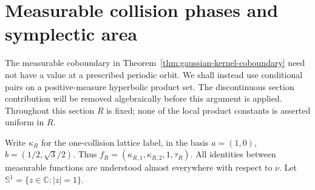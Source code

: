 \section{Measurable collision phases and symplectic area}
\label{sec:measurable-phase-rigidity}
The measurable coboundary in Theorem~\ref{thm:gaussian-kernel-coboundary}
need not have a value at a prescribed periodic orbit. We shall instead
use conditional pairs on a positive-measure hyperbolic product set.
The discontinuous section contribution will be removed algebraically
before this argument is applied. Throughout this section $R$ is fixed;
none of the local product constants is asserted uniform in $R$.

Write $\kappa_R$ for the one-collision lattice label, in the basis
$a=(1,0)$, $b=(1/2,\sqrt3/2)$. Thus
$f_R=(\kappa_{R,1},\kappa_{R,2},1,\tau_R)$. All identities between
measurable functions are understood almost everywhere with respect to
$\nu$. Let $\mathbb S^1=\{z\in\mathbb C:|z|=1\}$.

